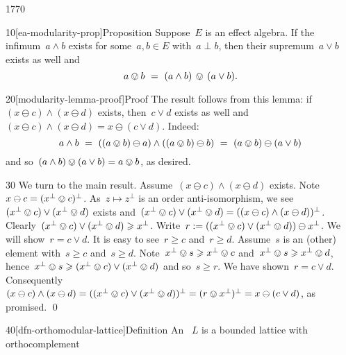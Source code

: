 \begin{parsec}{1770}%
\begin{point}{10}[ea-modularity-prop]{Proposition}%
Suppose~$E$ is an effect algebra.
If the infimum~$a \wedge b$
    exists for some~$a,b \in E$ with~$a \perp b$,
    then their supremum~$a \vee b$ exists as well and
\begin{equation*}
    a \ovee b \ = \ (a \wedge b) \,\ovee\, (a \vee b).
\end{equation*}
\begin{point}{20}[modularity-lemma-proof]{Proof}%
The result follows from this lemma:
    if~$(x \ominus c) \wedge (x \ominus d)$ exists,
    then~$c \vee d$ exists as well
    and~$(x \ominus c) \wedge (x \ominus d)
        = x \ominus (c \vee d)$.
Indeed:
\begin{equation*}
    a \wedge b \ = \ 
        ((a \ovee b) \ominus a) \wedge ((a \ovee b) \ominus b) \ = \ 
        (a \ovee b) \ominus (a \vee b)
\end{equation*}
    and so~$(a \wedge b) \ovee (a \vee b) = a \ovee b$, as desired.
\begin{point}{30}%
We turn to the main result.
Assume~$(x \ominus c) \wedge (x \ominus d)$ exists.
Note~$x \ominus c = (x^\perp \ovee c)^\perp$.
As~$z \mapsto z^\perp$ is an order anti-isomorphism,
    we see~$(x^\perp \ovee c) \vee (x^\perp \ovee d)$
        exists and~$(x^\perp \ovee c) \vee (x^\perp \ovee d)
                                    = ((x \ominus c)\wedge (x \ominus d))^\perp$.
Clearly~$ (x^\perp \ovee c) \vee
        (x^\perp \ovee d) \geq x^\perp$.
    Write~$r := ((x^\perp \ovee c) \vee
        (x^\perp \ovee d)) \ominus x^\perp$.
We will show~$r = c \vee d$.
It is easy to see~$r \geq c$ and~$r \geq d$.
Assume~$s$ is an (other) element with~$s \geq c$ and~$s \geq d$.
Note~$x^\perp \ovee s \geq x^\perp \ovee c$
and~$x^\perp \ovee s \geq x^\perp \ovee d$,
    hence~$x^\perp \ovee s \geq (x^\perp \ovee c) \vee (x^\perp \ovee d)$
    and so~$ s \geq  r$.
We have shown~$r = c \vee d$.
Consequently~$ (x \ominus c)\wedge (x \ominus d)
        = ((x^\perp \ovee c) \vee (x^\perp \ovee d))^\perp
        = (r \ovee x^\perp)^\perp = 
            x \ominus (c \vee d) $, as promised. \qed
\end{point}    
\end{point}
\end{point}
\begin{point}{40}[dfn-orthomodular-lattice]{Definition}%
An ~$L$
    \index{ortholattice}
    is a bounded lattice with orthocomplement

\end{point}
\end{parsec}
